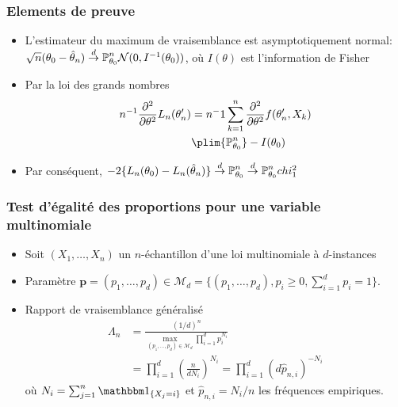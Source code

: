 \begin{frame}
\frametitle{Elements de preuve}
\begin{itemize}
\item L'estimateur du maximum de vraisemblance est asymptotiquement normal: $\sqrt{n} (\theta_{0}-\hat{\theta}_{n}) \stackrel{d}{\rightarrow}{\operatorname{{\mathbb P}}_{\theta_0}^n} \mathcal{N}(0,I^{-1}(\theta_0))$, où $I(\theta)$ est l'information de Fisher
\item Par la loi des grands nombres 
\begin{align*}
n^{-1} \frac{\partial^{2}}{\partial\theta^{2}}L_n(\theta_{n}') 
&= n^-1 \sum_{k=1}^n \frac{\partial^{2}}{\partial\theta^{2}} f(\theta'_n,X_k)\\
&\plim{\PP_{\theta_0}^n} -I(\theta_0) 
\end{align*}
\item Par conséquent, $-2 \{ L_n(\theta_{0})-L_n(\hat{\theta}_{n}) \} \stackrel{d}{\rightarrow}{\operatorname{{\mathbb P}}_{\theta_0}^n} \stackrel{d}{\rightarrow}{\operatorname{{\mathbb P}}_{\theta_0}^n} chi^2_1$
\end{itemize}
\end{frame}

\begin{frame}
\frametitle{Test d'égalité des proportions pour une variable multinomiale}
\begin{itemize}
\item Soit $(X_1,\dots,X_n)$ un $n$-échantillon d'une loi multinomiale à $d$-instances
\item \alert{Paramètre} $\mathbf{p}= (p_1,\dots,p_d) \in \mathcal{M}_d= \{ (p_1, \dots, p_d), p_i \geq 0, \sum_{i=1}^d p_i =1 \}$.
\item \alert{Rapport de vraisemblance généralisé}
\begin{align*}
\Lambda_n
&= \frac{(1/d)^n}{\max_{(p_1,\dots,p_d) \in \mathcal{M}_d} \prod_{i=1}^d p_i^{N_i} } \\
&= \prod_{i=1}^d \left( \frac{n}{d N_i} \right)^{N_i} = \prod_{i=1}^d (d \hat{p}_{n,i})^{-N_i}
\end{align*}
où $N_i= \sum_{j=1}^n \indi{X_j=i}$  et $\hat{p}_{n,i}= N_i/n$ les fréquences empiriques.
\end{itemize}
\end{frame}

